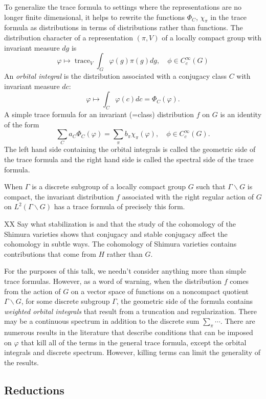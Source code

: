 \documentclass[brochure,english,12pt]{bourbaki}
\def\op#1{{\operatorname{#1}}}
\begin{document}
To generalize the trace formula to settings where the representations are no longer
finite dimensional, it helps to rewrite the functions $\Phi_C$, $\chi_\pi$
in the trace formula as distributions in terms of distributions rather than functions.
The distribution character of a representation $(\pi,V)$ of a locally compact group with
invariant measure $dg$ is 
\[\varphi \mapsto \op{trace}_V \int_G \varphi(g)\pi(g) dg, \quad \phi\in C_c^\infty(G)
\]
An {\it orbital integral} is the distribution associated with a conjugacy class $C$ with
invariant measure $dc$:
\[
\varphi \mapsto\int_C \varphi(c) dc  = \Phi_C(\varphi).
\]
A simple trace formula for an invariant (=class) distribution $f$ on $G$ is an identity of the
form 
\[
 \sum_C a_C \Phi_C(\varphi) = \sum_{\pi} b_\pi \chi_\pi(\varphi),\quad  \phi\in C_c^\infty(G).
\]
The left hand side containing the orbital integrals is called the
geometric side of the trace formula and the right hand side is called
the spectral side of the trace formula.

When $\Gamma$ is a discrete subgroup of a locally compact group $G$
such that $\Gamma\backslash G$ is compact, the invariant distribution
$f$ associated with the right regular action of $G$ on
$L^2(\Gamma\backslash G)$ has a trace formula of precisely this form.

XX Say what stabilization is and that the study of the cohomology of the
Shimura varieties shows that conjugacy and stable conjugacy affect the
cohomology in subtle ways.  The cohomology of Shimura varieties contains
contributions that come from $H$ rather than $G$.

For the purposes of this talk, we needn't consider anything more than
simple trace formulas.  However, as a word of warning, when the
distribution $f$ comes from the action of $G$ on a vector space of
functions on a noncompact quotient $\Gamma\backslash G$, for some
discrete subgroup $\Gamma$, the geometric side of the formula contains
{\it weighted orbital integrals} that result from a truncation and
regularization.  There may be a continuous spectrum in addition to the
discrete sum $\sum_\pi \cdots$.  There are numerous results in the
literature that describe conditions that can be imposed on $\varphi$
that kill all of the terms in the general trace formula, except the
orbital integrals and discrete spectrum.  However, killing terms can
limit the generality of the results.


\subsection{Reductions}
\end{document}
